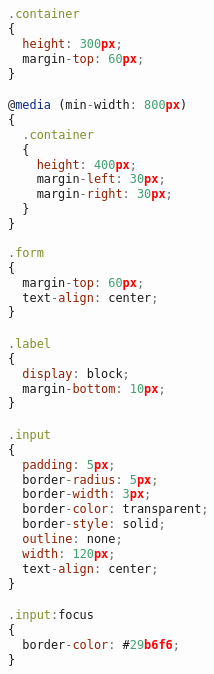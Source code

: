 \documentclass[a4paper,12pt,twoside,openright,titlepage]{book}
\begin{document}
\bigskip

\begin{lstlisting}[title={raspberrypi/ui/styles/LineGraph.module.css}, language=JavaScript]
.container
{
  height: 300px;
  margin-top: 60px;
}

@media (min-width: 800px)
{
  .container
  {
    height: 400px;
    margin-left: 30px;
    margin-right: 30px;
  }
}
\end{lstlisting}

\bigskip

\begin{lstlisting}[title={raspberrypi/ui/styles/TextField.module.css}, language=JavaScript]
.form
{
  margin-top: 60px;
  text-align: center;
}

.label
{
  display: block;
  margin-bottom: 10px;
}

.input
{
  padding: 5px;
  border-radius: 5px;
  border-width: 3px;
  border-color: transparent;
  border-style: solid;
  outline: none;
  width: 120px;
  text-align: center;
}

.input:focus
{
  border-color: #29b6f6;
}
\end{lstlisting}

\backmatter
\cleardoublepage{}


\end{document}
